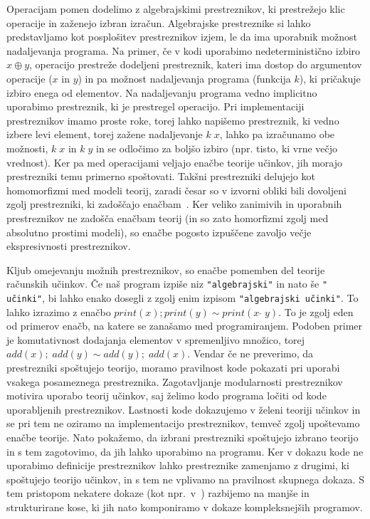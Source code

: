 \documentclass{article}
\begin{document}
Operacijam pomen dodelimo z algebrajskimi prestreznikov, ki prestrežejo klic operacije in zaženejo izbran izračun. Algebrajske prestreznike si lahko predstavljamo kot posplošitev prestreznikov izjem, le da ima uporabnik možnost nadaljevanja programa. Na primer, če v kodi uporabimo nedeterministično izbiro $x \oplus y$, operacijo prestreže dodeljeni prestreznik, kateri ima dostop do argumentov operacije ($x$ in $y$) in pa možnost nadaljevanja programa (funkcija $k$), ki pričakuje izbiro enega od elementov. Na nadaljevanju programa vedno implicitno uporabimo prestreznik, ki je prestregel operacijo. Pri implementaciji prestreznikov imamo proste roke, torej lahko napišemo prestreznik, ki vedno izbere levi element, torej zažene nadaljevanje $k\; x$, lahko pa izračunamo obe možnosti, $k\; x$ in $k\; y$ in se odločimo za boljšo izbiro (npr. tisto, ki vrne večjo vrednost). Ker pa med operacijami veljajo enačbe teorije učinkov, jih morajo prestrezniki temu primerno spoštovati. Takšni prestrezniki delujejo kot homomorfizmi med modeli teorij, zaradi česar so v izvorni obliki bili dovoljeni zgolj prestrezniki, ki zadoščajo enačbam~\cite{DBLP:conf/esop/PlotkinP09}. Ker veliko zanimivih in uporabnih prestreznikov ne zadošča enačbam teorij (in so zato homorfizmi zgolj med absolutno prostimi modeli), so enačbe pogosto izpuščene zavoljo večje ekspresivnosti prestreznikov.

Kljub omejevanju možnih prestreznikov, so enačbe pomemben del teorije računskih učinkov. Če naš program izpiše niz \texttt{"algebrajski"} in nato še \texttt{" učinki"}, bi lahko enako dosegli z zgolj enim izpisom \texttt{"algebrajski učinki"}. To lahko izrazimo z enačbo $print(x); print(y) \sim print(x\;\hat{}\;y)$. To je zgolj eden od primerov enačb, na katere se zanašamo med programiranjem. Podoben primer je komutativnost dodajanja elementov v spremenljivo množico, torej $add(x);\; add(y) \sim add(y);\; add(x)$. Vendar če ne preverimo, da prestrezniki spoštujejo teorijo, moramo pravilnost kode pokazati pri uporabi vsakega posameznega prestreznika. Zagotavljanje modularnosti prestreznikov motivira uporabo teorij učinkov, saj želimo kodo programa ločiti od kode uporabljenih prestreznikov. Lastnosti kode dokazujemo v želeni teoriji učinkov in se pri tem ne oziramo na implementacijo prestreznikov, temveč zgolj upoštevamo enačbe teorije. Nato pokažemo, da izbrani prestrezniki spoštujejo izbrano teorijo in s tem zagotovimo, da jih lahko uporabimo na programu. Ker v dokazu kode ne uporabimo definicije prestreznikov lahko prestreznike zamenjamo z drugimi, ki spoštujejo teorijo učinkov, in s tem ne vplivamo na pravilnost skupnega dokaza. S tem pristopom nekatere dokaze (kot npr.\ v~\cite{DBLP:journals/jlp/BauerP15}) razbijemo na manjše in strukturirane kose, ki jih nato komponiramo v dokaze kompleksnejših programov.
\end{document}
